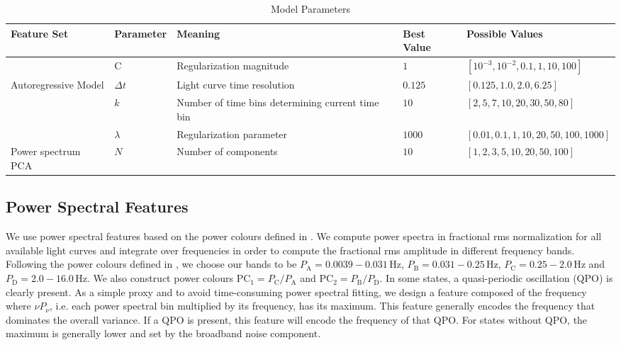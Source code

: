 \documentclass[fleqn,usenatbib]{mnras}
\begin{document}
\begin{table}[hbtp]
\renewcommand{\arraystretch}{1.3}
\footnotesize
\caption{Model Parameters}
\begin{threeparttable} 
\begin{tabularx}{\textwidth}{p{2.0cm}p{2.0cm}p{5.0cm}p{1.0cm}p{6.0cm}}
\toprule
\bf{Feature Set} & \bf{Parameter} & \bf{Meaning} & Best Value &  \bf{Possible Values} \\ \midrule
		& C & Regularization magnitude & $1$ & $[10^{-3}, 10^{-2}, 0.1, 1, 10, 100]$ \\ \midrule
 Autoregressive Model & $\Delta t$ & Light curve time resolution & $0.125$ & $[0.125, 1.0, 2.0, 6.25]$ \\
		& $k$ & Number of time bins determining current time bin & $10$ & $[2, 5, 7, 10, 20, 30, 50, 80]$ \\
		& $\lambda$ & Regularization parameter & $1000$ & $[0.01, 0.1, 1, 10, 20, 50, 100, 1000]$ \\ \midrule
Power spectrum PCA & $N$ & Number of components & $10$ & $[1,2,3,5,10,20,50,100]$ \\

 \bottomrule
\end{tabularx}
   \begin{tablenotes}
      \item{}
\end{tablenotes}
\end{threeparttable}
\label{table:parameters}
\end{table}

\subsection{Power Spectral Features}

We use power spectral features based on the power colours defined in \citep{heil2015}. We compute power spectra in fractional rms normalization for all available light curves and integrate over frequencies in order to compute the fractional rms amplitude in different frequency bands. 
Following the power colours defined in \citet{heil2015}, we choose our bands to be $P_\mathrm{A} = 0.0039-0.031 \,\mathrm{Hz}$, 
$P_\mathrm{B} = 0.031-0.25 \,\mathrm{Hz}$, $P_\mathrm{C} =  0.25-2.0 \,\mathrm{Hz}$ and $P_\mathrm{D} = 2.0-16.0 \,\mathrm{Hz}$. We also construct power colours $\mathrm{PC}_1 = P_\mathrm{C}/P_\mathrm{A}$ and  $\mathrm{PC}_2 = P_\mathrm{B}/P_\mathrm{D}$.
In some states, a quasi-periodic oscillation (QPO) is clearly present. As a simple proxy and to avoid time-consuming power spectral fitting, we design a feature composed of the frequency where $\nu P_\nu$, i.e. each power spectral bin multiplied by its frequency,  has its maximum. This feature generally encodes the frequency that dominates the overall variance. If a QPO is present, this feature will encode the frequency of that QPO. For states without QPO, the maximum is generally lower and set by the broadband noise component.
\end{document}
